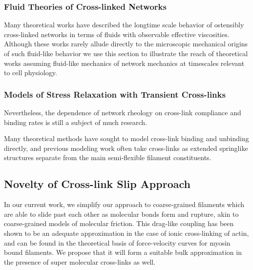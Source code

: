 \documentclass[pre,reprint]{revtex4-1}
\begin{document}
\subsubsection{Fluid Theories of Cross-linked Networks}

Many theoretical works have described the longtime scale behavior of ostensibly cross-linked networks in terms of fluids with observable effective viscosities.  Although these works rarely allude directly to the microscopic mechanical origins of such fluid-like behavior we use this section to illustrate the reach of theoretical works assuming fluid-like mechanics of network mechanics at timescales relevant to cell physiology.

\subsubsection{Models of Stress Relaxation with Transient Cross-links}

Nevertheless, the dependence of network rheology on cross-link compliance and binding rates is still a subject of much research\cite{theo_crosslinkslip2}.  

Many theoretical methods have sought to model cross-link binding and unbinding directly\cite{theo_crosslinkslip1,theo_crosslinkslip2}, and previous modeling work often take cross-links as extended springlike structures \cite{model_taeyoon} separate from the main semi-flexible filament constituents.  


\subsection{Novelty of Cross-link Slip Approach}


In our current work, we simplify our approach to coarse-grained filaments which are able to slide past each other as molecular bonds form and rupture, akin to coarse-grained models of molecular friction\cite{theo_friction,theo_frictionSam,theo_molefric}.  This drag-like coupling has been shown to be an adequate approximation in the case of ionic cross-linking of actin\cite{mol_fric,theo_hydroish2}, and can be found in the theoretical basis of force-velocity curves for myosin bound filaments\cite{theo_frictionShila}. We propose that it will form a suitable bulk approximation in the presence of super molecular cross-links as well.
\end{document}
